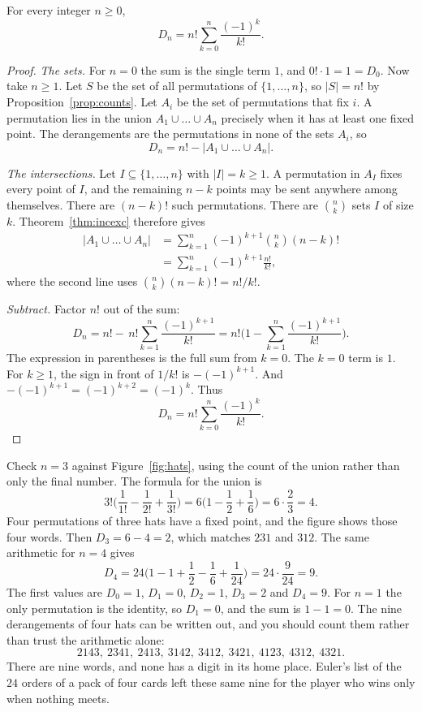 \begin{proposition}[derangements]\label{prop:derang}
For every integer $n\ge0$,
\[
D_n=n!\sum_{k=0}^n\frac{(-1)^k}{k!}.
\]
\end{proposition}
\begin{proof}
\emph{The sets.} For $n=0$ the sum is the single term $1$, and $0!\cdot 1=1=D_0$. Now take $n\ge 1$. Let $S$ be the set of all permutations of $\{1,\dots,n\}$, so $|S|=n!$ by Proposition~\ref{prop:counts}. Let $A_i$ be the set of permutations that fix $i$. A permutation lies in the union $A_1\cup\dots\cup A_n$ precisely when it has at least one fixed point. The derangements are the permutations in none of the sets $A_i$, so
\[
D_n=n!-\bigl|A_1\cup\dots\cup A_n\bigr|.
\]

\emph{The intersections.} Let $I\subseteq\{1,\dots,n\}$ with $|I|=k\ge 1$. A permutation in $A_I$ fixes every point of $I$, and the remaining $n-k$ points may be sent anywhere among themselves. There are $(n-k)!$ such permutations. There are $\binom nk$ sets $I$ of size $k$. Theorem~\ref{thm:incexc} therefore gives
\begin{align*}
\bigl|A_1\cup\dots\cup A_n\bigr|
&=\sum_{k=1}^n(-1)^{k+1}\binom nk(n-k)!\\
&=\sum_{k=1}^n(-1)^{k+1}\frac{n!}{k!},
\end{align*}
where the second line uses $\binom nk(n-k)!=n!/k!$.

\emph{Subtract.} Factor $n!$ out of the sum:
\[
D_n=n!-\,n!\sum_{k=1}^n\frac{(-1)^{k+1}}{k!}
=n!\Biggl(1-\sum_{k=1}^n\frac{(-1)^{k+1}}{k!}\Biggr).
\]
The expression in parentheses is the full sum from $k=0$. The $k=0$ term is $1$. For $k\ge 1$, the sign in front of $1/k!$ is $-(-1)^{k+1}$. And $-(-1)^{k+1}=(-1)^{k+2}=(-1)^k$. Thus
\[
D_n=n!\sum_{k=0}^n\frac{(-1)^k}{k!}.
\]
\end{proof}

Check $n=3$ against Figure~\ref{fig:hats}, using the count of the union rather than only the final number. The formula for the union is
\[
3!\Biggl(\frac{1}{1!}-\frac{1}{2!}+\frac{1}{3!}\Biggr)=6\Biggl(1-\frac12+\frac16\Biggr)=6\cdot\frac23=4.
\]
Four permutations of three hats have a fixed point, and the figure shows those four words. Then $D_3=6-4=2$, which matches $231$ and $312$. The same arithmetic for $n=4$ gives
\[
D_4=24\Biggl(1-1+\frac12-\frac16+\frac1{24}\Biggr)=24\cdot\frac{9}{24}=9.
\]
The first values are $D_0=1$, $D_1=0$, $D_2=1$, $D_3=2$ and $D_4=9$. For $n=1$ the only permutation is the identity, so $D_1=0$, and the sum is $1-1=0$. The nine derangements of four hats can be written out, and you should count them rather than trust the arithmetic alone:
\[
2143,\ 2341,\ 2413,\ 3142,\ 3412,\ 3421,\ 4123,\ 4312,\ 4321.
\]
There are nine words, and none has a digit in its home place. Euler's list of the $24$ orders of a pack of four cards left these same nine for the player who wins only when nothing meets.

